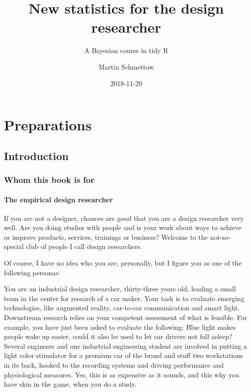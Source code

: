 \documentclass[]{svmono}
\title{New statistics for the design researcher}
\subtitle{A Bayesian course in tidy R}
\author{Martin Schmettow}
\date{2018-11-20}
\theoremstyle{definition}
\theoremstyle{definition}
\theoremstyle{definition}
\theoremstyle{remark}
\begin{document}
\maketitle

{
\setcounter{tocdepth}{1}
\tableofcontents
}
\part{Preparations}\label{part-preparations}

\chapter{Introduction}\label{introduction}

\section{Whom this book is for}\label{whom-this-book-is-for}

\subsection{The empirical design
researcher}\label{the-empirical-design-researcher}

If you are not a designer, chances are good that you are a design
researcher very well. Are you doing studies with people and is your work
about ways to achieve or improve products, services, trainings or
business? Welcome to the not-so-special club of people I call design
researchers.

Of course, I have no idea who you are, personally, but I figure you as
one of the following personas:

You are an industrial design researcher, thirty-three years old, leading
a small team in the center for research of a car maker. Your task is to
evaluate emerging technologies, like augmented reality, car-to-car
communication and smart light. Downstream research relies on your
competent assessment of what is feasible. For example, you have just
been asked to evaluate the following: Blue light makes people wake up
easier, could it also be used to let car drivers not fall asleep?
Several engineers and one industrial engineering student are involved in
putting a light color stimulator for a premium car of the brand and
stuff two workstations in its back, hooked to the recording systems and
driving performance and physiological measures. Yes, this is as
expensive as it sounds, and this why you have skin in the game, when you
do a study.
\end{document}
